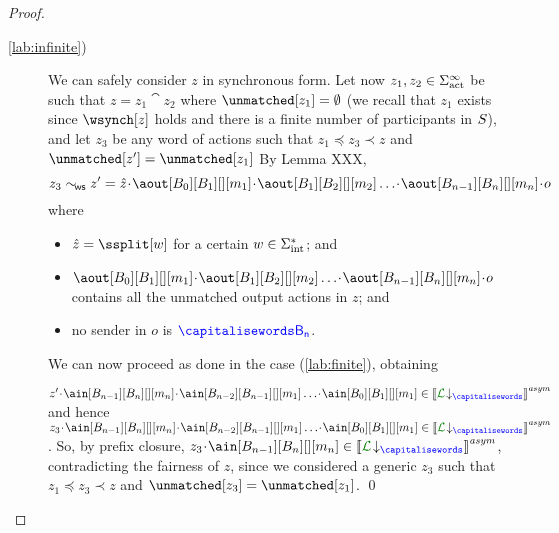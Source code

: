 \begin{proof}
\begin{description}
%
%
\item[ \ref{lab:infinite})]
%
We can safely consider $z$ in synchronous form.
Let now
$z_1, z_2\in\Sigma_{\text{act}}^\infty$ be such that $z=z_1\cat z_2$  where $\unmatched[z_1]=\emptyset$
(we recall that $z_1$ exists since $\wsynch[z]$ holds and
there is a finite number of participants in $S$),
and let $z_3$ be any word of actions such that  
$z_1\preceq z_3\prec z$ and $\unmatched[z']=\unmatched[z_1]$
By Lemma XXX, 
 $$z_3\commds z' = \hat z \cat\aout[B_0][B_1][][m_1]\cat\aout[B_1][B_2][][m_2]\ldots\cat\aout[B_{n-1}][B_n][][m_n]\cat o$$
  where
  \begin{itemize}
  \item
 $\hat z = \ssplit[\acword]$ for a certain $w\in\Sigma_{\text{int}}^*$; and 
 \item 
 $\aout[B_0][B_1][][m_1]\cat\aout[B_1][B_2][][m_2]\ldots\cat\aout[B_{n-1}][B_n][][m_n]\cat o$ 
 contains all the unmatched  output actions in $z$; and
 \item
 no sender in $o$ is $\ptp[B_n]$.
 \end{itemize}  

We can now proceed as done in the case (\ref{lab:finite}), obtaining

$z'\cat \ain[B_{n-1}][B_n][][m_n] \cat\ain[B_{n-2}][B_{n-1}][][m_1]\ldots\cat\ain[B_0][B_1][][m_1]\in\asem{\proj{\clang}{}}$ and hence
$z_3\cat \ain[B_{n-1}][B_n][][m_n] \cat\ain[B_{n-2}][B_{n-1}][][m_1]\ldots\cat\ain[B_0][B_1][][m_1]\in\asem{\proj{\clang}{}}$. So, by prefix closure, $z_3\cat \ain[B_{n-1}][B_n][][m_n]\in\asem{\proj{\clang}{}}$,
contradicting the fairness of $z$, since we considered a generic $z_3$ such that
 $z_1\preceq z_3\prec z$ and $\unmatched[z_3]=\unmatched[z_1]$. 
\qed
 \end{description}
\end{proof} 
